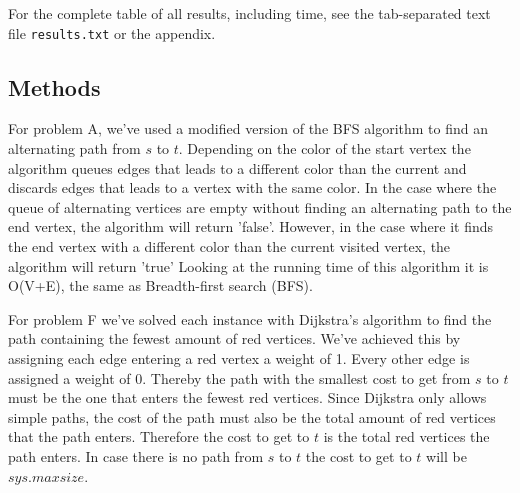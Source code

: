 \documentclass{tufte-handout}
\begin{document}
For the complete table of all results, including time, see the tab-separated text file {\tt results.txt} or the appendix.

\subsection{Methods}
For problem A, we've used a modified version of the BFS algorithm to find an alternating path from $s$ to $t$. Depending on the color of the start vertex the algorithm queues edges that leads to a different color than the current and discards edges that leads to a vertex with the same color. In the case where the queue of alternating vertices are empty without finding an alternating path to the end vertex, the algorithm will return 'false'. However, in the case where it finds the end vertex with a different color than the current visited vertex, the algorithm will return 'true'
Looking at the running time of this algorithm it is O(V+E), the same as Breadth-first search (BFS).

For problem F we've solved each instance with Dijkstra's algorithm to find the path containing the fewest amount of red vertices. We've achieved this by assigning each edge entering a red vertex a weight of 1. Every other edge is assigned a weight of 0. Thereby the path with the smallest cost to get from $s$ to $t$ must be the one that enters the fewest red vertices. Since Dijkstra only allows simple paths, the cost of the path must also be the total amount of red vertices that the path enters. Therefore the cost to get to $t$ is the total red vertices the path enters. In case there is no path from $s$ to $t$ the cost to get to $t$ will be $sys.maxsize$.
\end{document}

